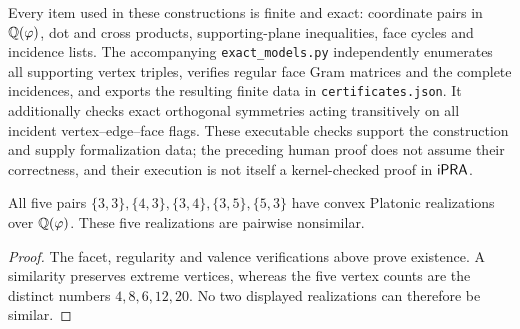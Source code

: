 Every item used in these constructions is finite and exact: coordinate
pairs in $\mathbb Q(\varphi)$, dot and cross products, supporting-plane
inequalities, face cycles and incidence lists.  The accompanying
\texttt{exact\_models.py} independently enumerates all supporting
vertex triples, verifies regular face Gram matrices and the complete
incidences, and exports the resulting finite data in
\texttt{certificates.json}.  It additionally checks exact orthogonal
symmetries acting transitively on all incident vertex--edge--face
flags.  These executable checks support the construction and supply
formalization data; the preceding human proof does not assume their
correctness, and their execution is not itself a kernel-checked proof
in $\mathsf{iPRA}$.

\begin{proposition}\label{prop:five-examples}
All five pairs
$\{3,3\},\{4,3\},\{3,4\},\{3,5\},\{5,3\}$ have convex
Platonic realizations over $\mathbb Q(\varphi)$.  These five realizations are
pairwise nonsimilar.
\end{proposition}
\begin{proof}
The facet, regularity and valence verifications above prove existence.
A similarity preserves extreme vertices, whereas the five vertex counts
are the distinct numbers $4,8,6,12,20$.  No two displayed realizations
can therefore be similar.
\end{proof}
